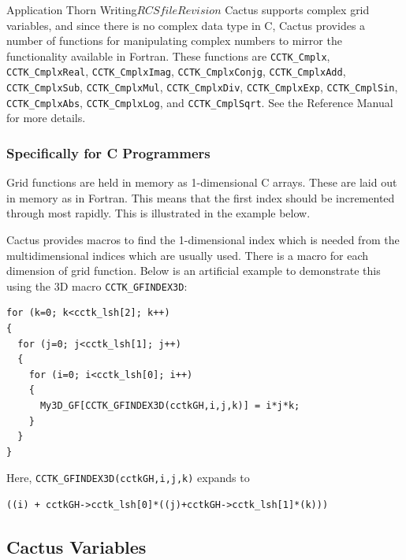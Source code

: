 \begin{cactuspart}{Application Thorn Writing}{$RCSfile$}{$Revision$}
Cactus supports complex grid variables, and since there is no
complex data type in C, Cactus provides a number
of functions for manipulating complex numbers to mirror the
functionality available in Fortran. These functions are \texttt{CCTK\_Cmplx},
\texttt{CCTK\_CmplxReal}, \texttt{CCTK\_CmplxImag}, \texttt{CCTK\_CmplxConjg},
\texttt{CCTK\_CmplxAdd}, \texttt{CCTK\_CmplxSub}, \texttt{CCTK\_CmplxMul},
\texttt{CCTK\_CmplxDiv}, \texttt{CCTK\_CmplxExp}, \texttt{CCTK\_CmplSin},
\texttt{CCTK\_CmplxAbs}, \texttt{CCTK\_CmplxLog}, and \texttt{CCTK\_CmplSqrt}.
See the Reference Manual for more details.


\subsubsection{Specifically for C Programmers}

Grid functions are held in memory as 1-dimensional C arrays. These are laid
out in memory as in Fortran. This means that the first index should
be incremented through most rapidly.  This is illustrated in the example
below.

Cactus provides
macros to find the 1-dimensional index which is needed from the multidimensional
indices which are usually used. There is a macro for each dimension of
grid function.  Below is an artificial example to demonstrate this
using the 3D macro \texttt{CCTK\_GFINDEX3D}:
\begin{verbatim}
for (k=0; k<cctk_lsh[2]; k++)
{
  for (j=0; j<cctk_lsh[1]; j++)
  {
    for (i=0; i<cctk_lsh[0]; i++)
    {
      My3D_GF[CCTK_GFINDEX3D(cctkGH,i,j,k)] = i*j*k;
    }
  }
}
\end{verbatim}
%
Here, \verb|CCTK_GFINDEX3D(cctkGH,i,j,k)| expands to
\begin{verbatim}
((i) + cctkGH->cctk_lsh[0]*((j)+cctkGH->cctk_lsh[1]*(k)))
\end{verbatim}

\subsection{Cactus Variables}
\label{sec:cactus_variables_c}


\end{cactuspart}
